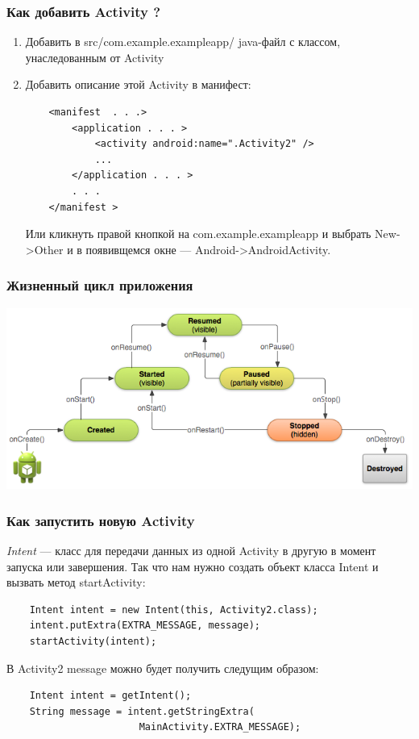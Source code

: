 \begin{frame}[fragile]
	\frametitle{Как добавить Activity ?}

	\begin{enumerate}
	\item{Добавить в src/com.example.exampleapp/ java-файл с классом, унаследованным от Activity}
	\item{Добавить описание этой Activity в манифест:}
	\begin{verbatim}
	<manifest  . . .>
	    <application . . . >
	        <activity android:name=".Activity2" />
	        ...
	    </application . . . >
	    . . .
	</manifest >
	\end{verbatim}

	\bigskip
	Или кликнуть правой кнопкой на com.example.exampleapp и выбрать New->Other и в появивщемся окне --- Android->AndroidActivity.
	\end{enumerate}
\end{frame}


\begin{frame}[fragile]
	\frametitle{Жизненный цикл приложения}

	\includegraphics[scale=0.48]{basic-lifecycle.png}
\end{frame}

\begin{frame}[fragile]
	\frametitle{Как запустить новую Activity}

	\emph{Intent} --- класс для передачи данных из одной Activity в другую в момент запуска или завершения. Так что нам нужно создать объект класса Intent и вызвать метод startActivity:

	\begin{verbatim}
	Intent intent = new Intent(this, Activity2.class);
	intent.putExtra(EXTRA_MESSAGE, message);
	startActivity(intent);
	\end{verbatim}

	\medskip
	В Activity2 message можно будет получить следущим образом:
	\begin{verbatim}
	Intent intent = getIntent();
	String message = intent.getStringExtra(
	                   MainActivity.EXTRA_MESSAGE);
	\end{verbatim}

\end{frame}

